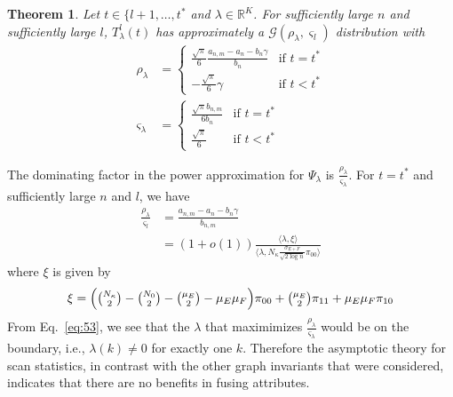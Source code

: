 \documentclass[final]{IEEEtran}
\newtheorem{theorem}{Theorem}
\theoremstyle{definition}
\begin{document}
\begin{theorem}
  \label{thm:6}
  Let $t \in \{l+1, \dots, t^{*}$ and $\lambda \in
  \mathbb{R}^{K}$. For sufficiently large $n$ and sufficiently large
  $l$, $T_{\lambda}^{l}(t)$ has approximately a
  $\mathcal{G}(\rho_{\lambda}, \varsigma_{l})$ distribution with
  \begin{align}
    \label{eq:52}
    \rho_{\lambda} &= \begin{cases}
      \tfrac{\sqrt{\pi}}{6} \tfrac{a_{n,m} - a_n - b_n \gamma}{b_n} & \text{if
        $t = t^{*}$} \\
      - \tfrac{\sqrt{\pi}}{6} \gamma & \text{if $t < t^{*}$} 
    \end{cases} \\
      \varsigma_{\lambda} &= \begin{cases}
        \tfrac{\sqrt{\pi} b_{n,m}}{6 b_n} & \text{if $t = t^{*}$} \\
        \tfrac{\sqrt{\pi}}{6} & \text{if $t < t^{*}$}
      \end{cases}
  \end{align}
\end{theorem}
The dominating factor in the power approximation for $\Psi_{\lambda}$
is $\tfrac{\rho_{\lambda}}{\varsigma_{\lambda}}$. For $t = t^{*}$ and
sufficiently large $n$ and $l$, we have
\begin{equation}
  \label{eq:53}
  \begin{split}
    \frac{\rho_{\lambda}}{\varsigma_{l}} &= \frac{a_{n,m} - a_n - b_n
      \gamma}{b_{n,m}} \\
    &= (1 + o(1)) \frac{ \langle \lambda, \xi \rangle}{\langle
      \lambda, N_{\kappa} \tfrac{\sigma_{E+F}}{\sqrt{2 \log{n}}}
      \pi_{00} \rangle}
  \end{split}
\end{equation}
where $\xi$ is given by
\begin{equation*}
 \xi =  \Bigl(\tbinom{N_{\kappa}}{2} -
    \tbinom{N_0}{2} - \tbinom{\mu_E}{2} - \mu_E \mu_F\Bigr)\pi_{00} +
    \tbinom{\mu_{E}}{2} \pi_{11} + \mu_E \mu_F \pi_{10}  
\end{equation*}
From Eq.~\eqref{eq:53}, we see that the $\lambda$ that maximimizes
$\tfrac{\rho_\lambda}{\varsigma_{\lambda}}$ would be on the boundary,
i.e., $\lambda(k) \not = 0$ for exactly one $k$. Therefore the asymptotic theory
for scan statistics, in contrast with the other graph invariants that
were considered, indicates that there are no benefits in fusing attributes.  
\appendices
\end{document}
